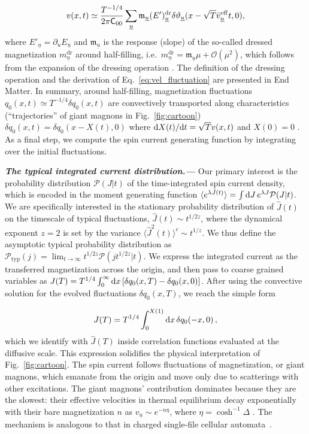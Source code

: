 \documentclass[
twocolumn,
amsfonts,
showpacs,
superscriptaddress,
amsmath,
amssymb,
aps,
longbibliography,
prl,
noeprint
]{revtex4-2}
\newcommand{\ch}[1]{{\color{black}  #1}}
\newcommand{\be}{\begin{equation}}
\newcommand{\ee}{\end{equation}}
\newcommand{\uu}{\underline{u}}
\newcommand{\Tx}{{x}}
\newcommand{\Tt}{{t}}
\newcommand{\bveff}{\bar{v}^\eff}
\newcommand{\dr}{{\mathrm{dr}}}
\newcommand{\para}[1]{ \noindent\emph{\textbf{#1---}}}
\newcommand{\p}{\partial}
\newcommand{\dd}{{\rm d}}
\newcommand{\1}{{\bf 1}}
\newcommand{\eff}{{\rm eff}}
\begin{document}
\be\label{eq:vel_fluctuation}
    v(x,t)\simeq \frac{T^{-1/4}}{2\pi\mathsf{C}_{00}}\sum_{\uu}\mathfrak{m}_{\uu}(E')^{\dr}_{\uu}\delta\vartheta_{\uu}(\Tx-\sqrt{T}\bveff_{\uu}\Tt,0),
\ee
where $E'_{\uu}=\p_uE_{\uu}$ and $\mathfrak{m}_{\underline{u}}$ is the response (slope) of the so-called dressed magnetization $m^\mathrm{dr}_{\underline{u}}$ around half-filling, i.e.~$m^\mathrm{dr}_{\underline{u}} = \mathfrak{m}_{\underline{u}}\mu + \mathcal{O}(\mu^2)$, \ch{which follows from the expansion of the dressing operation \cite{DeNardis2019}}. The definition of the dressing operation and the derivation of Eq.~\eqref{eq:vel_fluctuation} are presented in End Matter.
In summary, around half-filling, magnetization fluctuations $q_0(x,t)\simeq T^{-1/4}\delta q_0(x,t)$ are convectively transported along characteristics (``trajectories'' of giant magnons in Fig.~\ref{fig:cartoon}) $\delta q_0(\Tx,\Tt)=\delta q_0(\Tx-X(\Tt), 0)$
where $\dd X(\Tt)/\dd \Tt=\sqrt{T}v(\Tx,\Tt)$ and $X(0)=0$ .
As a final step, we compute the spin current generating function by integrating over the initial fluctuations.

\para{The typical integrated current distribution.}
Our primary interest is the probability distribution $\mathcal{P}(J|t)$ of the time-integrated spin current density, which is encoded in the moment generating function $\langle e^{ \lambda \hat{J}(t)}\rangle=\int\dd J\,e^{\lambda J}\mathcal{P}(J|t)$.
We are specifically interested in the stationary probability distribution of $\hat{J}(t)$ on the timescale of typical fluctuations, $\hat{J}(t)\sim t^{1/{2z}}$, where the dynamical exponent $z=2$ is set by the variance $\langle \hat{J}^2(t)\rangle^c\sim t^{1/{z}}$. We thus define the asymptotic typical probability distribution as $\mathcal{P}_\mathrm{typ}(j)=\lim_{t\to\infty}t^{1/2z}\mathcal{P}(jt^{1/2z}|t)$.
We express the integrated current as the transferred magnetization across the origin, and then pass to coarse grained variables as $J(T)=T^{1/4}\int_0^\infty\dd x\,[\delta q_0(x,T)-\delta q_0(x,0)]$. After using the convective solution for the evolved fluctuations $\delta q_0(x,T)$, we reach the simple form

\be\label{eq_curr_fluct}
J(T)=T^{1/4}\int_0^{X(1)}\dd x \, \delta q_0(-x,0)\,,
\ee
which we identify with $\hat{J}(T)$ inside correlation functions evaluated at the diffusive scale.
\ch{This expression solidifies the physical interpretation of Fig.~\ref{fig:cartoon}.}
The spin current follows fluctuations of magnetization, or giant magnons, which emanate from the origin and move only due to scatterings with other excitations. The giant magnons' contribution dominates because they are the slowest: their effective velocities in thermal equilibrium decay exponentially with their bare magnetization $n$ as $v_{\underline{u}}\sim e^{-n\eta}$, where $\eta=\cosh^{-1}\Delta$ \cite{de_nardis_diffusion_2019}.
The mechanism is analogous to that in charged single-file cellular automata~\cite{Yoshimura2025}.
\end{document}
